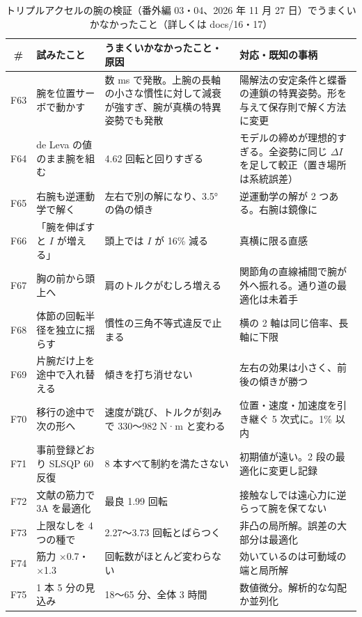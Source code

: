 \documentclass[paper=a4paper,fontsize=10pt,twocolumn,column_gap=2zw,line_length=24zw,number_of_lines=46,head_space=20mm]{jlreq}
\begin{document}
\begin{table}[t]\centering\footnotesize
\caption{トリプルアクセルの腕の検証（番外編 03・04、2026 年 11 月 27 日）でうまくいかなかったこと（詳しくは docs/16・17）}\label{tab:fail5}
\setlength{\tabcolsep}{3pt}
\begin{tabular}{cp{}p{}p{}}\toprule
\# & 試みたこと & うまくいかなかったこと・原因 & 対応・既知の事柄 \\\midrule
F63 & 腕を位置サーボで動かす & 数 ms で発散。上腕の長軸の小さな慣性に対して減衰が強すぎ、腕が真横の特異姿勢でも発散 & 陽解法の安定条件と蝶番の連鎖の特異姿勢。形を与えて保存則で解く方法に変更 \\
F64 & de Leva の値のまま腕を組む & 4.62 回転と回りすぎる & モデルの締めが理想的すぎる。全姿勢に同じ $\Delta I$ を足して較正（置き場所は系統誤差） \\
F65 & 右腕も逆運動学で解く & 左右で別の解になり、3.5° の偽の傾き & 逆運動学の解が 2 つある。右腕は鏡像に \\
F66 & 「腕を伸ばすと $I$ が増える」 & 頭上では $I$ が 16\% 減る & 真横に限る直感 \\
F67 & 胸の前から頭上へ & 肩のトルクがむしろ増える & 関節角の直線補間で腕が外へ振れる。通り道の最適化は未着手 \\
F68 & 体節の回転半径を独立に揺らす & 慣性の三角不等式違反で止まる & 横の 2 軸は同じ倍率、長軸に下限 \\
F69 & 片腕だけ上を途中で入れ替える & 傾きを打ち消せない & 左右の効果は小さく、前後の傾きが勝つ \\
F70 & 移行の途中で次の形へ & 速度が跳び、トルクが刻みで 330〜982 N·m と変わる & 位置・速度・加速度を引き継ぐ 5 次式に。1\% 以内 \\
F71 & 事前登録どおり SLSQP 60 反復 & 8 本すべて制約を満たさない & 初期値が遠い。2 段の最適化に変更し記録 \\
F72 & 文献の筋力で 3A を最適化 & 最良 1.99 回転 & 接触なしでは遠心力に逆らって腕を保てない \\
F73 & 上限なしを 4 つの種で & 2.27〜3.73 回転とばらつく & 非凸の局所解。誤差の大部分は最適化 \\
F74 & 筋力 ×0.7・×1.3 & 回転数がほとんど変わらない & 効いているのは可動域の端と局所解 \\
F75 & 1 本 5 分の見込み & 18〜65 分、全体 3 時間 & 数値微分。解析的な勾配か並列化 \\\bottomrule
\end{tabular}
\end{table}
\end{document}
